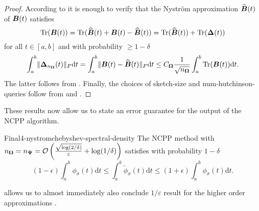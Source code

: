 \begin{proof}
    According to  it is enough to verify that the Nystr\"om approximation $\widehat{\boldsymbol{B}}(t)$ of $\boldsymbol{B}(t)$ satisfies
    \begin{equation}
        \operatorname{Tr}(\boldsymbol{B}(t)) = \operatorname{Tr}(\widehat{\boldsymbol{B}}(t) + \boldsymbol{B}(t) - \widehat{\boldsymbol{B}}(t)) = \operatorname{Tr}(\widehat{\boldsymbol{B}}(t)) + \operatorname{Tr}(\boldsymbol{\Delta}(t))
    \end{equation}
    for all $t \in [a, b]$ and with probability $\geq 1 - \delta$
    \begin{equation}
        \int_{a}^{b} \lVert \boldsymbol{\Delta}_{n_{\boldsymbol{\Omega}}}(t) \rVert _F \mathrm{d}t = \int_{a}^{b} \lVert \boldsymbol{B}(t) - \widehat{\boldsymbol{B}}(t) \rVert _F \mathrm{d}t \leq C_{\boldsymbol{\Omega}} \frac{1}{\sqrt{n_{\boldsymbol{\Omega}}}} \int_{a}^{b} \operatorname{Tr}(\boldsymbol{B}(t)) \mathrm{d}t.
    \end{equation}
    The latter follows from . Finally, the choices of \gls{sketch-size} and \gls{num-hutchinson-queries} follow from  and .
\end{proof}

These results now allow us to state an error guarantee for the output of the
\gls{NCPP} algorithm.
\begin{theorem}{Final}{4-nystromchebyshev-spectral-density}
    The \gls{NCPP} method with $n_{\boldsymbol{\Omega}} = n_{\boldsymbol{\Psi}} = \mathcal{O}\left( \frac{\sqrt{\log(2/\delta)}}{\varepsilon} + \log(1/\delta) \right)$
     satisfies with probability $1 - \delta$
    \begin{equation}
        (1 - \epsilon) \int_{a}^{b} \phi_{\sigma}(t) \mathrm{d}t \leq \int_{a}^{b} \widetilde{\phi}_{\sigma}(t) \mathrm{d}t \leq (1 + \epsilon) \int_{a}^{b} \phi_{\sigma}(t) \mathrm{d}t.
    \end{equation}
\end{theorem}

 allows us to almost immediately
also conclude $1/\varepsilon$ result for the higher order approximations
.

